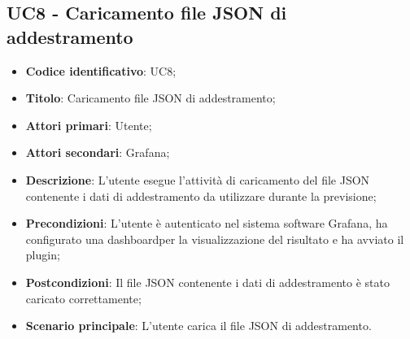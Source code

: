 \subsection{UC8 - Caricamento file JSON di addestramento}
\begin{itemize}
	\item \textbf{Codice identificativo}: UC8;
	\item \textbf{Titolo}: Caricamento file JSON di addestramento;
	\item \textbf{Attori primari}: Utente;
	\item \textbf{Attori secondari}: Grafana\glo;
	\item \textbf{Descrizione}: L'utente esegue l'attività di caricamento del file JSON contenente i dati di addestramento da utilizzare durante la previsione;
	\item \textbf{Precondizioni}: L'utente è autenticato nel sistema software Grafana\glosp, ha configurato una dashboard\glosp per la visualizzazione del risultato e ha avviato il plugin;
	\item \textbf{Postcondizioni}: Il file JSON contenente i dati di addestramento è stato caricato correttamente;
	\item \textbf{Scenario principale}: L'utente carica il file JSON di addestramento.
\end{itemize}